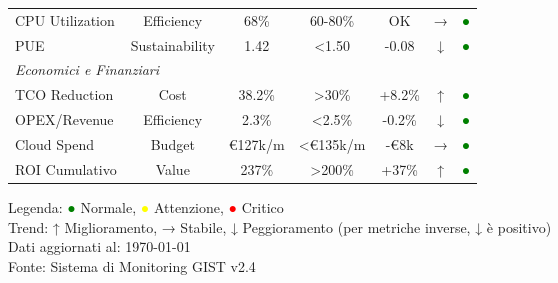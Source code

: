 \begin{table}[htbp]
\begin{tabular}{lcccccc}
CPU Utilization & Efficiency & 68\% & 60-80\% & OK & → & \textcolor{green}{●} \\
PUE & Sustainability & 1.42 & <1.50 & -0.08 & ↓ & \textcolor{green}{●} \\
\midrule
\multicolumn{7}{l}{\textit{Economici e Finanziari}} \\
\midrule
TCO Reduction & Cost & 38.2\% & >30\% & +8.2\% & ↑ & \textcolor{green}{●} \\
OPEX/Revenue & Efficiency & 2.3\% & <2.5\% & -0.2\% & ↓ & \textcolor{green}{●} \\
Cloud Spend & Budget & €127k/m & <€135k/m & -€8k & → & \textcolor{green}{●} \\
ROI Cumulativo & Value & 237\% & >200\% & +37\% & ↑ & \textcolor{green}{●} \\
\bottomrule
\end{tabular}
\vspace{0.2cm}
\begin{flushleft}
\footnotesize
Legenda: \textcolor{green}{●} Normale, \textcolor{yellow}{●} Attenzione, \textcolor{red}{●} Critico\\
Trend: ↑ Miglioramento, → Stabile, ↓ Peggioramento (per metriche inverse, ↓ è positivo)\\
Dati aggiornati al: \today\\
Fonte: Sistema di Monitoring GIST v2.4
\end{flushleft}
\end{table}


